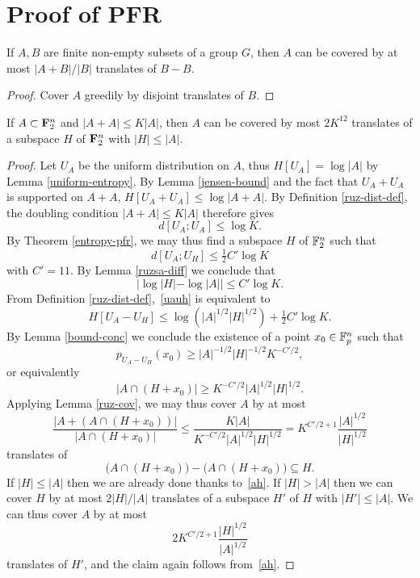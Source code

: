 \chapter{Proof of PFR}

\begin{lemma}
\label{ruz-cov}
\leanok
If $A,B$ are finite non-empty subsets of a group $G$, then $A$ can be covered by at most $|A+B|/|B|$ translates of $B-B$.
\end{lemma}
\begin{proof}
\leanok
Cover $A$ greedily by disjoint translates of $B$.
\end{proof}

\begin{theorem}[PFR]\label{pfr}  If $A \subset {\bf F}_2^n$ and $|A+A| \leq K|A|$, then $A$ can be covered by most $2K^{12}$ translates of a subspace $H$ of ${\bf F}_2^n$ with $|H| \leq |A|$.
\end{theorem}

\begin{proof}
  Let $U_A$ be the uniform distribution on $A$, thus $H[U_A] = \log |A|$ by Lemma \ref{uniform-entropy}. By Lemma \ref{jensen-bound} and the fact that $U_A + U_A$ is supported on $A + A$, $H[U_A + U_A] \leq \log|A+A|$. By Definition \ref{ruz-dist-def}, the doubling condition $|A+A| \leq K|A|$ therefore gives
  \[ d[U_A;U_A] \leq \log K.\]
  By Theorem \ref{entropy-pfr}, we may thus find a subspace $H$ of $\mathbb{F}_2^n$ such that
  \begin{equation}\label{uauh} d[U_A;U_H] \leq \tfrac{1}{2} C' \log K\end{equation}
  with $C' = 11$.
  By Lemma \ref{ruzsa-diff} we conclude that
  \begin{equation}\label{ah}
    |\log |H| - \log |A|| \leq C' \log K.
  \end{equation}
  From Definition \ref{ruz-dist-def},~\eqref{uauh} is equivalent to
  \[ H[U_A - U_H] \leq \log( |A|^{1/2} |H|^{1/2}) + \tfrac{1}{2} C' \log K.\]
  By Lemma \ref{bound-conc} we conclude the existence of a point $x_0 \in \mathbb{F}_p^n$ such that
  \[ p_{U_A-U_H}(x_0) \geq |A|^{-1/2} |H|^{-1/2} K^{-C'/2},\]
  or equivalently
  \[ |A \cap (H + x_0)| \geq K^{-C'/2} |A|^{1/2} |H|^{1/2}.\]
  Applying Lemma \ref{ruz-cov}, we may thus cover $A$ by at most
  \[ \frac{|A + (A \cap (H+x_0))|}{|A \cap (H + x_0)|} \leq \frac{K|A|}{K^{-C'/2} |A|^{1/2} |H|^{1/2}} = K^{C'/2+1} \frac{|A|^{1/2}}{|H|^{1/2}}\]
  translates of
  \[ \bigl(A \cap (H + x_0)\bigr) - \bigl(A \cap (H + x_0)\bigr) \subseteq H.\]
  If $|H| \leq |A|$ then we are already done thanks to~\eqref{ah}.  If $|H| > |A|$ then we can cover $H$ by at most $2 |H|/|A|$ translates of a subspace $H'$ of $H$ with $|H'| \leq |A|$.  We can thus cover $A$ by at most
  \[ 2K^{C'/2+1} \frac{|H|^{1/2}}{|A|^{1/2}}\]
  translates of $H'$, and the claim again follows from~\eqref{ah}.
\end{proof}
